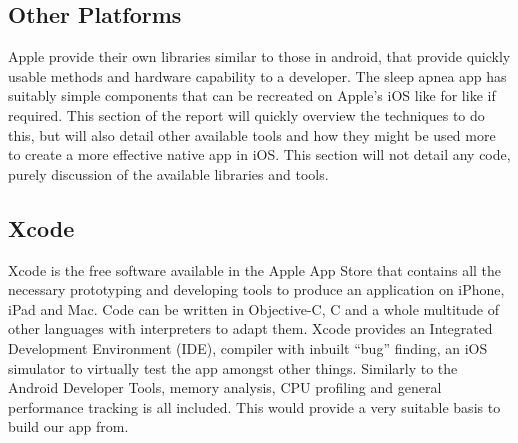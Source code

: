 \subsection{Other Platforms}
Apple provide their own libraries similar to those in android, that provide quickly usable methods and hardware capability to a developer. The sleep apnea app has suitably simple components that can be recreated on Apple's iOS like for like if required. This section of the report will quickly overview the techniques to do this, but will also detail other available tools and how they might be used more to create a more effective native app in iOS. This section will not detail any code, purely discussion of the available libraries and tools.
\subsection{Xcode}
Xcode is the free software available in the Apple App Store that contains all the necessary prototyping and developing tools to produce an application on iPhone, iPad and Mac. Code can be written in Objective-C, C and a whole multitude of other languages with interpreters to adapt them. Xcode provides an Integrated Development Environment (IDE), compiler with inbuilt ``bug'' finding, an iOS simulator to virtually test the app amongst other things. Similarly to the Android Developer Tools, memory analysis, CPU profiling and general performance tracking is all included. This would provide a very suitable basis to build our app from.
